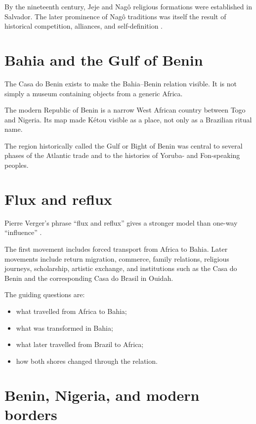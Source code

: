 By the nineteenth century, Jeje and Nag\^o
religious formations were established in
Salvador.  The later prominence of Nag\^o
traditions was itself the result of
historical competition, alliances, and
self-definition \cite{pares2010nago}.

\section{Bahia and the Gulf of Benin}
\label{section-bahia-gulf-benin}

The Casa do Benin exists to make the
Bahia--Benin relation visible.  It is not
simply a museum containing objects from a
generic Africa.

The modern Republic of Benin is a narrow
West African country between Togo and
Nigeria.  Its map made K\'etou visible as a
place, not only as a Brazilian ritual
name.

The region historically called the Gulf or
Bight of Benin was central to several
phases of the Atlantic trade and to the
histories of Yoruba- and Fon-speaking
peoples.

\section{Flux and reflux}
\label{section-flux-reflux}

Pierre Verger's phrase ``flux and reflux''
gives a stronger model than one-way
``influence'' \cite{verger2021fluxo}.

The first movement includes forced
transport from Africa to Bahia.  Later
movements include return migration,
commerce, family relations, religious
journeys, scholarship, artistic exchange,
and institutions such as the Casa do
Benin and the corresponding Casa do Brasil
in Ouidah.

The guiding questions are:

\begin{itemize}
\item what travelled from Africa to Bahia;
\item what was transformed in Bahia;
\item what later travelled from Brazil to
Africa;
\item how both shores changed through the
relation.
\end{itemize}

\section{Benin, Nigeria, and modern borders}
\label{section-benin-nigeria-borders}

